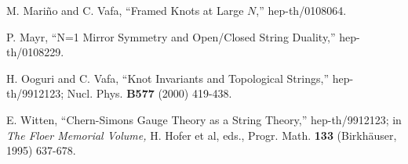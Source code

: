 \documentclass[a4paper,11pt]{article}
\begin{document}
\begin{thebibliography}{99}
 M. Mari\~no and C. Vafa,
``Framed Knots at Large $N$,'' hep-th/0108064.

 P. Mayr,
``N=1 Mirror Symmetry and Open/Closed String Duality,''
hep-th/0108229.

 H. Ooguri and C. Vafa,
``Knot Invariants and Topological Strings,''
hep-th/9912123;
Nucl. Phys. {\bf B577} (2000) 419-438.

 E. Witten,
``Chern-Simons Gauge Theory as a String Theory,''
hep-th/9912123;
in {\em The Floer Memorial Volume,} H. Hofer et al,
eds.,
Progr. Math. {\bf 133} (Birkh\"auser,
1995) 637-678.

\end{thebibliography}
\end{document}
